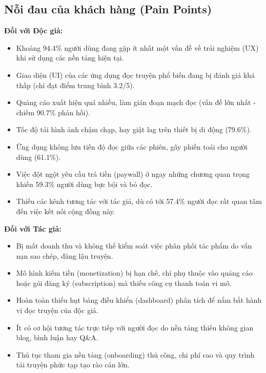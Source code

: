 \subsection{Nỗi đau của khách hàng (Pain Points)}
\textbf{Đối với Độc giả:}
\begin{itemize}
    \item Khoảng 94.4\% người dùng đang gặp ít nhất một vấn đề về trải nghiệm (UX) khi sử dụng các nền tảng hiện tại.
    \item Giao diện (UI) của các ứng dụng đọc truyện phổ biến đang bị đánh giá khá thấp (chỉ đạt điểm trung bình 3.2/5).
    \item Quảng cáo xuất hiện quá nhiều, làm gián đoạn mạch đọc (vấn đề lớn nhất - chiếm 90.7\% phản hồi).
    \item Tốc độ tải hình ảnh chậm chạp, hay giật lag trên thiết bị di động (79.6\%).
    \item Ứng dụng không lưu tiến độ đọc giữa các phiên, gây phiền toái cho người dùng (61.1\%).
    \item Việc đột ngột yêu cầu trả tiền (paywall) ở ngay những chương quan trọng khiến 59.3\% người dùng bực bội và bỏ đọc.
    \item Thiếu các kênh tương tác với tác giả, dù có tới 57.4\% người đọc rất quan tâm đến việc kết nối cộng đồng này.
\end{itemize}

\textbf{Đối với Tác giả:}
\begin{itemize}
    \item Bị mất doanh thu và không thể kiểm soát việc phân phối tác phẩm do vấn nạn sao chép, đăng lậu truyện.
    \item Mô hình kiếm tiền (monetization) bị hạn chế, chỉ phụ thuộc vào quảng cáo hoặc gói đăng ký (subscription) mà thiếu công cụ thanh toán vi mô.
    \item Hoàn toàn thiếu hụt bảng điều khiển (dashboard) phân tích để nắm bắt hành vi đọc truyện của độc giả.
    \item Ít có cơ hội tương tác trực tiếp với người đọc do nền tảng thiếu không gian blog, bình luận hay Q\&A.
    \item Thủ tục tham gia nền tảng (onboarding) thủ công, chi phí cao và quy trình tải truyện phức tạp tạo rào cản lớn.
\end{itemize}

